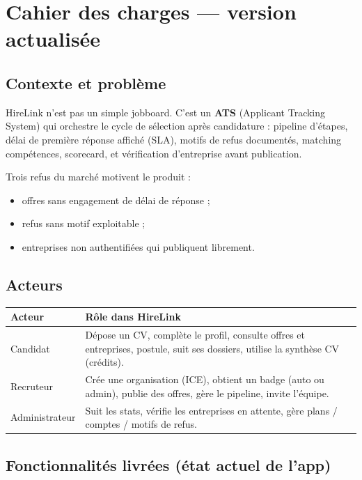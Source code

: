 \documentclass[11pt,a4paper,oneside]{report}
\begin{document}
\tableofcontents
\newpage

\chapter{Cahier des charges --- version actualisée}

\section{Contexte et problème}
HireLink n'est pas un simple jobboard. C'est un \textbf{ATS} (Applicant Tracking System) qui orchestre le cycle de sélection après candidature : pipeline d'étapes, délai de première réponse affiché (SLA), motifs de refus documentés, matching compétences, scorecard, et vérification d'entreprise avant publication.

Trois refus du marché motivent le produit :
\begin{itemize}[leftmargin=1.2em]
  \item offres sans engagement de délai de réponse ;
  \item refus sans motif exploitable ;
  \item entreprises non authentifiées qui publiquent librement.
\end{itemize}

\section{Acteurs}
\begin{tabularx}{\textwidth}{@{}lX@{}}
\toprule
\textbf{Acteur} & \textbf{Rôle dans HireLink} \\
\midrule
Candidat & Dépose un CV, complète le profil, consulte offres et entreprises, postule, suit ses dossiers, utilise la synthèse CV (crédits). \\
Recruteur & Crée une organisation (ICE), obtient un badge (auto ou admin), publie des offres, gère le pipeline, invite l'équipe. \\
Administrateur & Suit les stats, vérifie les entreprises en attente, gère plans / comptes / motifs de refus. \\
\bottomrule
\end{tabularx}

\section{Fonctionnalités livrées (état actuel de l'app)}
\end{document}
